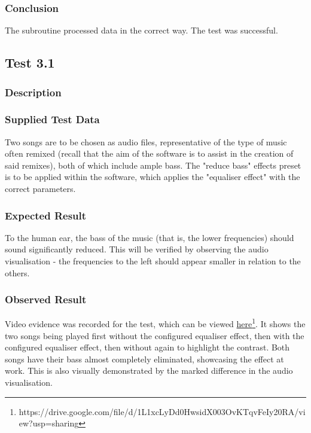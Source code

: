 \subsubsection*{Conclusion}
The subroutine processed data in the correct way. The test was successful.

\pagebreak
\subsection{Test 3.1}
\subsubsection*{Description}
\paragraph{}
{
	\centering
}

\subsubsection*{Supplied Test Data}
Two songs are to be chosen as audio files, representative of the type of music often remixed (recall that the aim of the software is to assist in the creation of said remixes), both of which include ample bass. The "reduce bass" effects preset is to be applied within the software, which applies the "equaliser effect" with the correct parameters.

\subsubsection*{Expected Result}
To the human ear, the bass of the music (that is, the lower frequencies) should sound significantly reduced. This will be verified by observing the audio visualisation - the frequencies to the left should appear smaller in relation to the others.

\subsubsection*{Observed Result}
\label{sec:evidence3.1}
Video evidence was recorded for the test, which can be viewed \href{https://drive.google.com/file/d/1L1xcLyDd0HwsidX003OvKTqvFeIy20RA/view?usp=sharing}{here}\footnote{
	https://drive.google.com/file/d/1L1xcLyDd0HwsidX003OvKTqvFeIy20RA/view?usp=sharing
}. It shows the two songs being played first without the configured equaliser effect, then with the configured equaliser effect, then without again to highlight the contrast. Both songs have their bass almost completely eliminated, showcasing the effect at work. This is also visually demonstrated by the marked difference in the audio visualisation.

